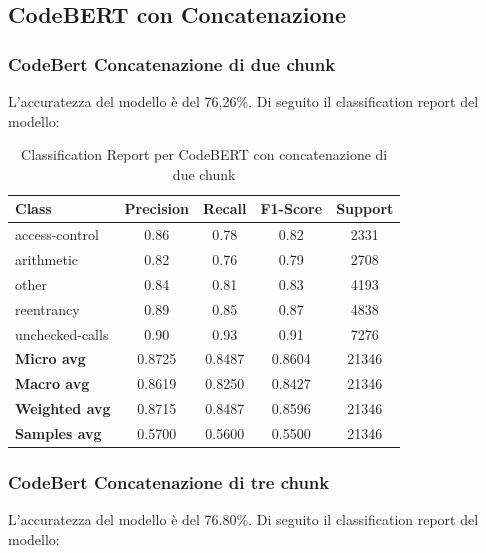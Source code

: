 \documentclass[../../Thesis.tex]{subfiles}
\begin{document}
\subsection{CodeBERT con Concatenazione}
\subsubsection{CodeBert Concatenazione di due chunk}
L'accuratezza del modello è del 76,26\%. Di seguito il classification report del modello:

\begin{table}[H]
    \centering
    \small
    \begin{tabular}{lcccc}
    \hline
    \textbf{Class} & \textbf{Precision} & \textbf{Recall} & \textbf{F1-Score} & \textbf{Support} \\
    \hline
    access-control & 0.86 & 0.78 & 0.82 & 2331 \\
    arithmetic & 0.82 & 0.76 & 0.79 & 2708 \\
    other & 0.84 & 0.81 & 0.83 & 4193 \\
    reentrancy & 0.89 & 0.85 & 0.87 & 4838 \\
    unchecked-calls & 0.90 & 0.93 & 0.91 & 7276 \\
    \hline
    \textbf{Micro avg} & 0.8725 & 0.8487 & 0.8604 & 21346 \\
    \textbf{Macro avg} & 0.8619 & 0.8250 & 0.8427 & 21346 \\
    \textbf{Weighted avg} & 0.8715 & 0.8487 & 0.8596 & 21346 \\
    \textbf{Samples avg} & 0.5700 & 0.5600 & 0.5500 & 21346 \\
    \hline
    \end{tabular}
    \caption{Classification Report per CodeBERT con concatenazione di due chunk}
    \end{table}
\subsubsection{CodeBert Concatenazione di tre chunk}
L'accuratezza del modello è del 76.80\%. Di seguito il classification report del modello:
\end{document}
